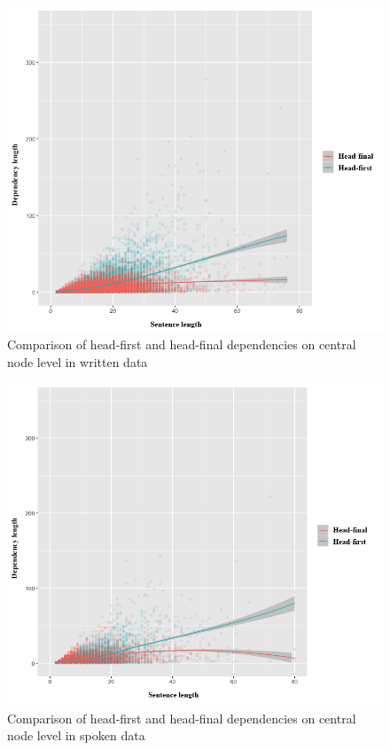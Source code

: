 \documentclass[10pt, a4paper, conference, compsocconf]{IEEEtran}
\begin{document}
\begin{figure}
  \centering
  \includegraphics[width=1\linewidth] {pics/tulisroot_DLposneg.png} 
	\caption{Comparison of head-first and head-final dependencies on central node level in written data}
	\label{fig:tulisroot_DLposneg} 
\end{figure}
%
\begin{figure}
  \centering
  \includegraphics[width=1\linewidth]{pics/lisanroot_DLposneg.png} 
	\caption{Comparison of head-first and head-final dependencies on central node level in spoken data}
	\label{fig:lisanroot_DLposneg} 
\end{figure}
\end{document}
